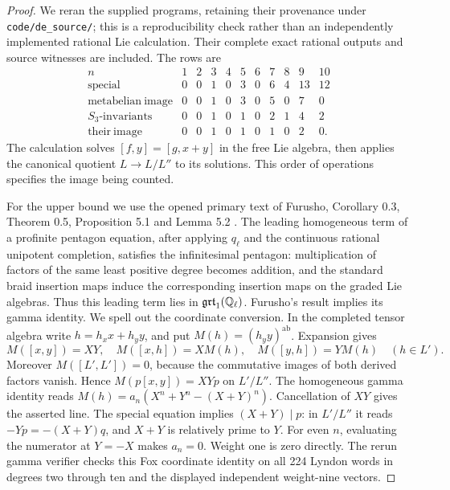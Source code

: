 \begin{proof}
We reran the supplied programs, retaining their provenance under
\texttt{code/de\_source/}; this is a reproducibility check rather than
an independently implemented rational Lie calculation. Their complete
exact rational outputs and source witnesses are included. The rows are
\[
\begin{array}{c|rrrrrrrrrr}
 n&1&2&3&4&5&6&7&8&9&10\\\hline
 \mathrm{special}&0&0&1&0&3&0&6&4&13&12\\
 \mathrm{metabelian\ image}&0&0&1&0&3&0&5&0&7&0\\
 S_3\text{-}\mathrm{invariants}&0&0&1&0&1&0&2&1&4&2\\
 \mathrm{their\ image}&0&0&1&0&1&0&1&0&2&0.
\end{array}
\]
The calculation solves $[f,y]=[g,x+y]$ in the free Lie algebra,
then applies the canonical quotient $L\to L/L''$ to its solutions.
This order of operations specifies the image being counted.

For the upper bound we use the opened primary text of Furusho,
Corollary 0.3, Theorem 0.5, Proposition 5.1 and Lemma 5.2
\cite{DE_Furusho2011}. The leading homogeneous term of a profinite
pentagon equation, after applying $q_\ell$ and the continuous rational
unipotent completion, satisfies the infinitesimal pentagon: multiplication
of factors of the same least positive degree becomes addition, and
the standard braid insertion maps induce the corresponding insertion
maps on the graded Lie algebras. Thus this leading term lies in
$\mathfrak{grt}_1(\mathbb Q_\ell)$. Furusho's result implies its gamma identity.
We spell out the coordinate conversion. In the completed tensor algebra
write $h=h_xx+h_yy$, and put $M(h)=(h_yy)^{\mathrm{ab}}$.
Expansion gives
\[
 M([x,y])=XY,\quad M([x,h])=XM(h),\quad
 M([y,h])=YM(h)\quad(h\in L').
\]
Moreover $M([L',L'])=0$, because the commutative images of both
derived factors vanish. Hence $M(p[x,y])=XYp$ on $L'/L''$.
The homogeneous gamma identity reads
$M(h)=a_n(X^n+Y^n-(X+Y)^n)$. Cancellation of $XY$ gives the asserted
line. The special equation implies $(X+Y)\mid p$: in $L'/L''$ it
reads $-Yp=-(X+Y)q$, and $X+Y$ is relatively prime to $Y$.
For even $n$, evaluating the numerator at $Y=-X$ makes $a_n=0$.
Weight one is zero directly. The rerun gamma verifier checks this Fox
coordinate identity on all 224 Lyndon words in degrees two through ten
and the displayed independent weight-nine vectors.
\end{proof}

